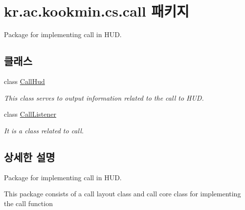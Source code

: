 \hypertarget{namespacekr_1_1ac_1_1kookmin_1_1cs_1_1call}{}\section{kr.\+ac.\+kookmin.\+cs.\+call 패키지}
\label{namespacekr_1_1ac_1_1kookmin_1_1cs_1_1call}


Package for implementing call in H\+U\+D.  


\subsection*{클래스}
\begin{DoxyCompactItemize}
\item 
class \hyperlink{classkr_1_1ac_1_1kookmin_1_1cs_1_1call_1_1_call_hud}{Call\+Hud}
\begin{DoxyCompactList}\small\item\em This class serves to output information related to the call to H\+U\+D. \end{DoxyCompactList}\item 
class \hyperlink{classkr_1_1ac_1_1kookmin_1_1cs_1_1call_1_1_call_listener}{Call\+Listener}
\begin{DoxyCompactList}\small\item\em It is a class related to call. \end{DoxyCompactList}\end{DoxyCompactItemize}


\subsection{상세한 설명}
Package for implementing call in H\+U\+D. 

This package consists of a call layout class and call core class for implementing the call function 